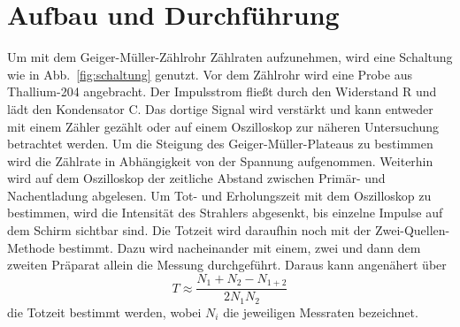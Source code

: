 \section {Aufbau und Durchführung}
\label{sec:durchführung}

Um mit dem Geiger-Müller-Zählrohr Zählraten aufzunehmen, wird eine Schaltung wie in Abb.~\ref{fig:schaltung} genutzt. Vor dem Zählrohr wird eine Probe aus Thallium-204 angebracht. Der Impulsstrom fließt durch den Widerstand R und lädt den Kondensator C. Das dortige Signal wird verstärkt und kann entweder mit einem Zähler gezählt oder auf einem Oszilloskop zur näheren Untersuchung betrachtet werden.
Um die Steigung des Geiger-Müller-Plateaus zu bestimmen wird die Zählrate in Abhängigkeit von der Spannung aufgenommen. Weiterhin wird auf dem Oszilloskop der zeitliche Abstand zwischen Primär- und Nachentladung abgelesen. Um Tot- und Erholungszeit mit dem Oszilloskop zu bestimmen, wird die Intensität des Strahlers abgesenkt, bis einzelne Impulse auf dem Schirm sichtbar sind. Die Totzeit wird daraufhin noch mit der Zwei-Quellen-Methode bestimmt. Dazu wird nacheinander mit einem, zwei und dann dem zweiten Präparat allein die Messung durchgeführt. Daraus kann angenähert über
\begin{equation}
    T \approx \frac{N_1 + N_2 - N_{1+2}}{2N_1N_2}
\end{equation}
die Totzeit bestimmt werden, wobei $N_{i}$ die jeweiligen Messraten bezeichnet.

